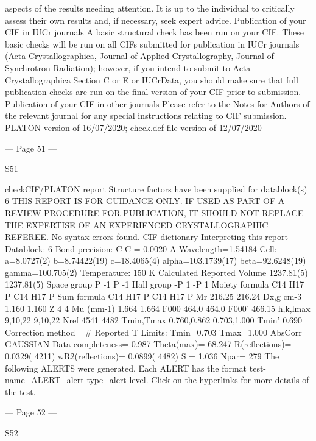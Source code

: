 aspects of the results needing attention. It is up to the individual to critically assess their own
results and, if necessary, seek expert advice.
Publication of your CIF in IUCr journals 
A basic structural check has been run on your CIF. These basic checks will be run on all CIFs
submitted for publication in IUCr journals (Acta Crystallographica, Journal of Applied 
Crystallography, Journal of Synchrotron Radiation); however, if you intend to submit to Acta
Crystallographica Section C or E or IUCrData, you should make sure that full publication checks
are run on the final version of your CIF prior to submission.
Publication of your CIF in other journals 
Please refer to the Notes for Authors of the relevant journal for any special instructions relating to
CIF submission.
PLATON version of 16/07/2020; check.def file version of 12/07/2020 


--- Page 51 ---
 
 
S51 
 
 
 
checkCIF/PLATON report 
Structure factors have been supplied for datablock(s) 6
THIS REPORT IS FOR GUIDANCE ONLY. IF USED AS PART OF A REVIEW PROCEDURE
FOR PUBLICATION, IT SHOULD NOT REPLACE THE EXPERTISE OF AN EXPERIENCED
CRYSTALLOGRAPHIC REFEREE.
No syntax errors found.        CIF dictionary        Interpreting this report
Datablock: 6 
Bond precision:
C-C = 0.0020 A
Wavelength=1.54184
Cell:
a=8.0727(2)
b=8.74422(19)
c=18.4065(4)
alpha=103.1739(17)
beta=92.6248(19)
gamma=100.705(2)
Temperature: 150 K
Calculated
Reported
Volume
1237.81(5)
1237.81(5)
Space group
P -1 
P -1 
Hall group
-P 1 
-P 1 
Moiety formula
C14 H17 P
C14 H17 P
Sum formula
C14 H17 P
C14 H17 P
Mr
216.25
216.24
Dx,g cm-3
1.160
1.160
Z
4
4
Mu (mm-1)
1.664
1.664
F000
464.0
464.0
F000’
466.15
h,k,lmax
9,10,22
9,10,22
Nref
4541 
4482 
Tmin,Tmax
0.760,0.862
0.703,1.000
Tmin’
0.690
Correction method= # Reported T Limits: Tmin=0.703 Tmax=1.000
AbsCorr = GAUSSIAN
Data completeness= 0.987
Theta(max)= 68.247
R(reflections)= 0.0329( 4211)
wR2(reflections)= 0.0899( 4482)
S = 1.036
Npar= 279
The following ALERTS were generated. Each ALERT has the format
       test-name_ALERT_alert-type_alert-level.
Click on the hyperlinks for more details of the test.


--- Page 52 ---
 
 
S52 
 
 
 
